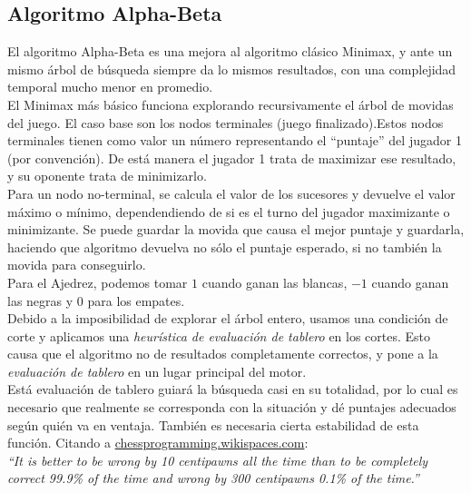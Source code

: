 \documentclass{article}
\begin{document}
\begin{multicols}{2}
\subsection{Algoritmo Alpha-Beta}

El algoritmo Alpha-Beta es una mejora al algoritmo clásico Minimax, y
ante un mismo árbol de búsqueda siempre da lo mismos resultados, con
una complejidad temporal mucho menor en promedio.
\\

El Minimax más básico funciona explorando recursivamente el árbol
de movidas del juego. El caso base son los nodos terminales (juego
finalizado).Estos nodos terminales tienen como valor un número
representando el ``puntaje'' del jugador 1 (por convención). De está
manera el jugador 1 trata de maximizar ese resultado, y su oponente
trata de minimizarlo.
\\

Para un nodo no-terminal, se calcula el valor de los sucesores y
devuelve el valor máximo o mínimo, dependendiendo de si es el turno
del jugador maximizante o minimizante. Se puede guardar la movida
que causa el mejor puntaje y guardarla, haciendo que algoritmo
devuelva no sólo el puntaje esperado, si no también la movida
para conseguirlo.
\\

Para el Ajedrez, podemos tomar $1$ cuando ganan las blancas, $-1$ cuando
ganan las negras y $0$ para los empates.
\\

Debido a la imposibilidad de explorar el árbol entero, usamos una
condición de corte y aplicamos una \emph{heurística de evaluación de
tablero} en los cortes. Esto causa que el algoritmo no de resultados
completamente correctos, y pone a la \emph{evaluación de tablero} en
un lugar principal del motor.
\\

Está evaluación de tablero guiará la búsqueda casi en su totalidad,
por lo cual es necesario que realmente se corresponda con la situación
y dé puntajes adecuados según quién va en ventaja. También es
necesaria cierta estabilidad de esta función. Citando a
\href{http://chessprogramming.wikispaces.com/}
{chessprogramming.wikispaces.com}:
\\

\emph{``It is better to be wrong by 10 centipawns all the time than to
be completely correct 99.9\% of the time and wrong by 300 centipawns
0.1\% of the time.''}
\\


\end{multicols}
\end{document}
